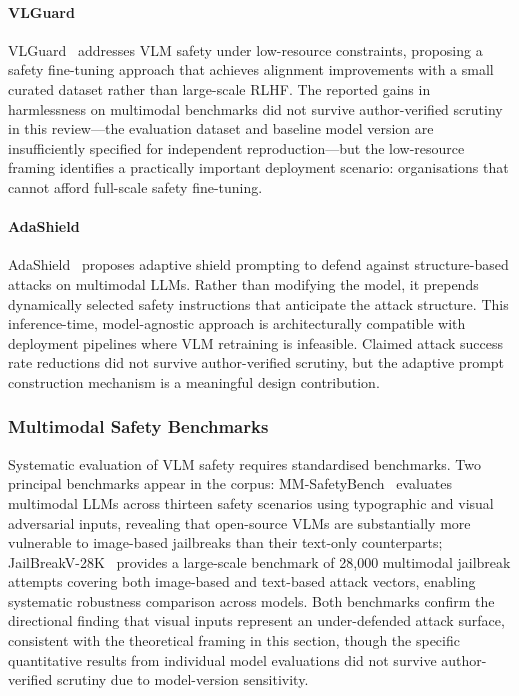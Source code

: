 \paragraph{VLGuard}
VLGuard~\cite{li2024vlguard} addresses VLM safety under low-resource constraints,
proposing a safety fine-tuning approach that achieves alignment improvements with a
small curated dataset rather than large-scale RLHF.
The reported gains in harmlessness on multimodal benchmarks did not survive
author-verified scrutiny in this review---the evaluation dataset and baseline
model version are insufficiently specified for independent reproduction---but the
low-resource framing identifies a practically important deployment scenario:
organisations that cannot afford full-scale safety fine-tuning.

\paragraph{AdaShield}
AdaShield~\cite{wang2024adashield} proposes adaptive shield prompting to defend
against structure-based attacks on multimodal LLMs.
Rather than modifying the model, it prepends dynamically selected safety instructions
that anticipate the attack structure.
This inference-time, model-agnostic approach is architecturally compatible with
deployment pipelines where VLM retraining is infeasible.
Claimed attack success rate reductions did not survive author-verified scrutiny, but
the adaptive prompt construction mechanism is a meaningful design contribution.

\subsubsection{Multimodal Safety Benchmarks}

Systematic evaluation of VLM safety requires standardised benchmarks.
Two principal benchmarks appear in the corpus:
MM-SafetyBench~\cite{liu2024mmsafetybench} evaluates multimodal LLMs across
thirteen safety scenarios using typographic and visual adversarial inputs, revealing
that open-source VLMs are substantially more vulnerable to image-based jailbreaks
than their text-only counterparts; JailBreakV-28K~\cite{luo2024jailbreakv} provides
a large-scale benchmark of 28,000 multimodal jailbreak attempts covering both
image-based and text-based attack vectors, enabling systematic robustness comparison
across models.
Both benchmarks confirm the directional finding that visual inputs represent an
under-defended attack surface, consistent with the theoretical framing in this
section, though the specific quantitative results from individual model evaluations
did not survive author-verified scrutiny due to model-version sensitivity.

